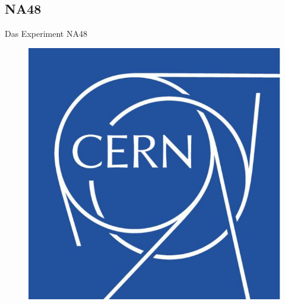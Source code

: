 \documentclass[aspectratio=1610, professionalfonts, 9pt, t]{beamer}
\begin{document}
  \subsection{NA48}

  \begin{frame}{Das Experiment NA48}
    \begin{figure}
      \includegraphics[height=0.8\textheight]{Images/ripcern.png}
    \end{figure}
  \end{frame}
\end{document}
